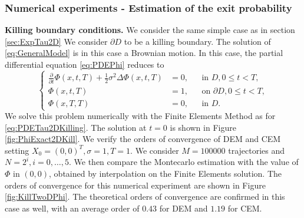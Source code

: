 \subsubsection{Numerical experiments - Estimation of the exit probability}

\textbf{Killing boundary conditions.} We consider the same simple case as in section \ref{sec:ExpTau2D} We consider $\partial D$ to be a killing boundary. The solution of \eqref{eq:GeneralModel} is in this case a Brownian motion. In this case, the partial differential equation \eqref{eq:PDEPhi} reduces to
\begin{equation}\label{eq:PDEPhi2DKilling}
	\left \{
  	\begin{aligned}
	\frac{\partial}{\partial t} \Phi(x,t,T) + \frac{1}{2} \sigma^2 \Delta \Phi(x,t,T) &= 0, && \text{in } D, 0 \leq t < T,\\
	\Phi(x,t,T) &= 1, && \text{on } \partial D, 0 \leq t < T,\\
	\Phi(x,T,T) &= 0, && \text{in } D.
  	\end{aligned} \right.
\end{equation}
We solve this problem numerically with the Finite Elements Method as for \eqref{eq:PDETau2DKilling}. The solution at $t = 0$ is shown in Figure \ref{fig:PhiExact2DKill}. We verify the orders of convergence of DEM and CEM setting $X_0 = (0,0)^T , \sigma = 1, T = 1$. We consider $M = 100000$ trajectories and $N = 2^i,i=0,\dots,5$. We then compare the Montecarlo estimation with the value of $\Phi$ in $(0,0)$, obtained by interpolation on the Finite Elements solution. The orders of convergence for this numerical experiment are shown in Figure \ref{fig:KillTwoDPhi}. The theoretical orders of convergence are confirmed in this case as well, with an average order of $0.43$ for DEM and $1.19$ for CEM.


